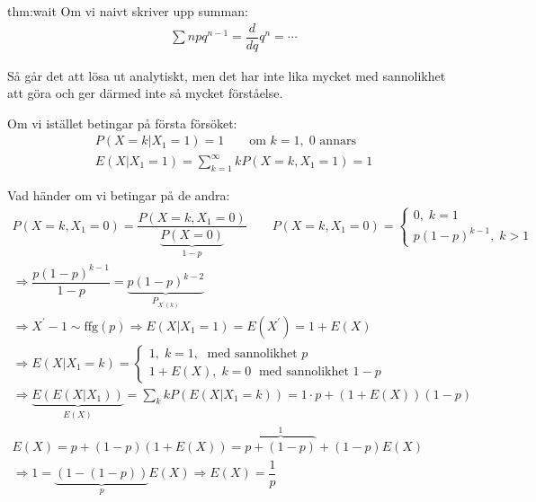 \begin{theo}[$E(X) = \dfrac{1}{p}$]{thm:wait}
  Om vi naivt skriver upp summan:
  \begin{equation*}
    \begin{gathered}
      \sum npq^{n-1} = \dfrac{d}{dq}q^n =\cdots
    \end{gathered}
  \end{equation*}\par
  \noindent Så går det att lösa ut analytiskt, men det har inte lika mycket med sannolikhet att göra och ger därmed inte så mycket förståelse.
  \par\bigskip
  \noindent Om vi istället betingar på första försöket:
  \begin{equation*}
    \begin{gathered}
      P(X=k|X_1=1) = 1\qquad\text{om } k=1,\;0\text{ annars}\\
      E(X|X_1=1) = \sum_{k=1}^{\infty}kP(X=k,X_1=1) = 1
    \end{gathered}
  \end{equation*}\par
  \noindent Vad händer om vi betingar på de andra:
  \begin{equation*}
    \begin{gathered}
      P(X =k, X_1=0) = \dfrac{P(X=k,X_1=0)}{\underbrace{P(X=0)}_{\text{$1-p$}}}\qquad P(X=k,X_1=0)=\begin{cases}0,\;k=1\\p(1-p)^{k-1},\;k>1\end{cases}\\
      \Rightarrow \dfrac{p(1-p)^{k-1}}{1-p} = \underbrace{p(1-p)^{k-2}}_{\text{$P_{X^{\prime}(k)}$}}\\
      \Rightarrow X^{\prime}-1\sim\text{ffg}(p)\Rightarrow E(X|X_1=1) = E(X^{\prime}) = 1+E(X)\\
      \Rightarrow E(X|X_1=k) = \begin{cases}1,\;k=1,\;\text{ med sannolikhet } p\\1+E(X),\;k=0\;\text{ med sannolikhet $1-p$}\end{cases}\\
      \Rightarrow \underbrace{E(E(X|X_1))}_{\text{$E(X)$}} = \sum_k kP(E(X|X_1 =k)) = 1\cdot p+(1+E(X))(1-p)\\
      E(X) = p+(1-p)(1+E(X)) = \overbrace{p+(1-p)}^{\text{$1$}}+(1-p)E(X)\\
      \Rightarrow 1 = \underbrace{(1-(1-p))}_{\text{$p$}}E(X)\Rightarrow E(X) =\dfrac{1}{p}
    \end{gathered}
  \end{equation*}
\end{theo}

